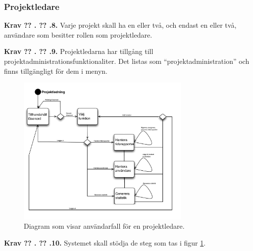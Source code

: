 \documentclass[a4paper]{article}
\newcommand\getcurrentref[1]{%
 \ifnumequal{\value{#1}}{0}
  {??}
  {\the\value{#1}}%
}
\newcommand\requirement[2]{
	\numberedrow{Krav}{#1}{#2}
}
\newcommand\numberedrow[3]{
	\noindent
	\textbf{#1 \getcurrentref{section}.\getcurrentref{subsection}.#2.} #3
	
}
\begin{document}
		\subsubsection*{Projektledare}
		\requirement{8}{Varje projekt skall ha en eller två, och endast en eller två, användare som besitter rollen som projektledare.}
		\requirement{9}{Projektledarna har tillgång till projektadministrationsfunktionaliter. Det listas som ``projektadministration'' och finns tillgängligt för dem i menyn.}
			\begin{figure}[h!]
				\centering
				\includegraphics[width=0.75\textwidth]{flow_common_proj_leader}
				\caption{Diagram som visar användarfall för en projektledare.}
				\label{image_gen_proboss}
			\end{figure}
		\requirement{10}{Systemet skall stödja de steg som tas i figur \ref{image_gen_proboss}.}
\end{document}
